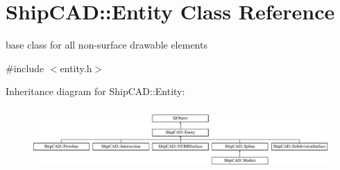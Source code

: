 \hypertarget{classShipCAD_1_1Entity}{\section{Ship\-C\-A\-D\-:\-:Entity Class Reference}
\label{classShipCAD_1_1Entity}
}


base class for all non-\/surface drawable elements  




{\ttfamily \#include $<$entity.\-h$>$}

Inheritance diagram for Ship\-C\-A\-D\-:\-:Entity\-:\begin{figure}[H]
\begin{center}
\leavevmode
\includegraphics[height=2.382979cm]{classShipCAD_1_1Entity}
\end{center}
\end{figure}
